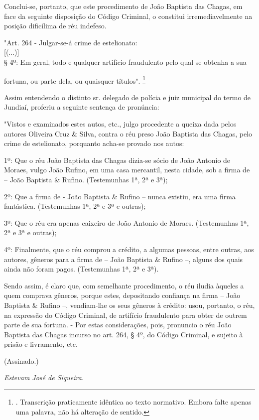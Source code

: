 Conclui-se, portanto, que este procedimento de João Baptista das Chagas,
em face da seguinte disposição do Código Criminal, o constitui
irremediavelmente na posição dificílima de réu indefeso.

"Art. 264 - Julgar-se-á crime de estelionato:\\
{[}(...){]}\\
§ 4º: Em geral, todo e qualquer artifício fraudulento pelo qual se
obtenha a sua

fortuna, ou parte dela, ou quaisquer títulos". \footnote{. Transcrição
  praticamente idêntica ao texto normativo. Embora falte apenas uma
  palavra, não há alteração de sentido.}

Assim entendendo o distinto sr. delegado de polícia e juiz municipal do
termo de Jundiaí, proferiu a seguinte sentença de pronúncia:

"Vistos e examinados estes autos, etc., julgo procedente a queixa dada
pelos autores Oliveira Cruz \& Silva, contra o réu preso João Baptista
das Chagas, pelo crime de estelionato, porquanto acha-se provado nos
autos:

1º: Que o réu João Baptista das Chagas dizia-se sócio de João Antonio de
Moraes, vulgo João Rufino, em uma casa mercantil, nesta cidade, sob a
firma de -- João Baptista \& Rufino. (Testemunhas 1ª, 2ª e 3ª);

2º: Que a firma de - João Baptista \& Rufino -- nunca existiu, era uma
firma fantástica. (Testemunhas 1ª, 2ª e 3ª e outras);

3º: Que o réu era apenas caixeiro de João Antonio de Moraes.
(Testemunhas 1ª, 2ª e 3ª e outras);

4º: Finalmente, que o réu comprou a crédito, a algumas pessoas, entre
outras, aos autores, gêneros para a firma de -- João Baptista \& Rufino
--, alguns dos quais ainda não foram pagos. (Testemunhas 1ª, 2ª e 3ª).

Sendo assim, é claro que, com semelhante procedimento, o réu iludia
àqueles a quem comprava gêneros, porque estes, depositando confiança na
firma -- João Baptista \& Rufino --, vendiam-lhe os seus gêneros à
crédito: usou, portanto, o réu, na expressão do Código Criminal, de
artifício fraudulento para obter de outrem parte de sua fortuna. - Por
estas considerações, pois, pronuncio o réu João Baptista das Chagas
incurso no art. 264, § 4º, do Código Criminal, e sujeito à prisão e
livramento, etc.

(Assinado.)

\emph{Estevam José de Siqueira. }

